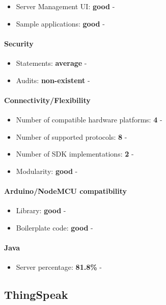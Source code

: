 \documentclass{article}
\begin{document}
\begin{itemize}
\item Server Management UI: \textbf{good} - 
\item Sample applications: \textbf{good} - 
\end{itemize}

\paragraph{Security} 

\begin{itemize}
\item Statements: \textbf{average} - 
\item Audits: \textbf{non-existent} - 
\end{itemize}

\paragraph{Connectivity/Flexibility}

\begin{itemize}
\item Number of compatible hardware platforms: \textbf{4} - 
\item Number of supported protocols: \textbf{8} - 
\item Number of SDK implementations: \textbf{2} - 
\item Modularity: \textbf{good} - 
\end{itemize}

\paragraph{Arduino/NodeMCU compatibility}

\begin{itemize}
\item Library: \textbf{good} - 
\item Boilerplate code: \textbf{good} - 
\end{itemize}

\paragraph{Java} 

\begin{itemize}
\item Server percentage: \textbf{81.8\%} - 
\end{itemize}

\subsection{ThingSpeak}
\end{document}
